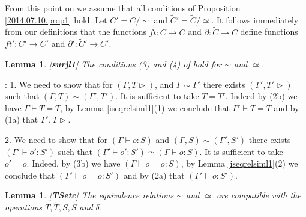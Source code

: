 \documentclass[11pt]{article}
\newenvironment{proof}{{\bf Proof}:}{\vskip 5mm }
\newtheorem{lemma}[proposition]{Lemma}
\newcommand{\llabel}[1]{\label{#1}[{\bf #1}]}
\newcommand{\sr}{\rightarrow}
\newcommand{\wt}{\widetilde}
\begin{document}
%
From this point on we assume that all conditions of Proposition \ref{2014.07.10.prop1}  hold. Let $C'=C/\sim$ and $\wt{C}'=\wt{C}/\simeq$. It follows immediately from our definitions that the functions $ft:C\sr C$ and $\partial:\wt{C}\sr C$ define functions $ft':C'\sr C'$ and $\partial':\wt{C}'\sr C'$.
%
\begin{lemma}
\llabel{surjl1}
The conditions (3) and (4) of \cite[Proposition 5.4]{Csubsystems} hold for $\sim$ and $\simeq$.
\end{lemma}
%
\begin{proof}
1. We need to show that for $(\Gamma,T\rhd)$, and $\Gamma\sim\Gamma'$ there exists $(\Gamma',T'\rhd)$ such that $(\Gamma,T)\sim(\Gamma',T')$. It is sufficient to take $T=T'$. Indeed by (2b) we have $\Gamma\vdash T=T$, by Lemma \ref{iseqrelsiml1}(1) we conclude that $\Gamma'\vdash T=T$ and by (1a) that $\Gamma',T\rhd$.  

2.  We need to show that for $(\Gamma\vdash o:S)$ and $(\Gamma,S)\sim(\Gamma',S')$ there exists $(\Gamma'\vdash o':S')$ such that $(\Gamma'\vdash o':S')\simeq(\Gamma\vdash o:S)$. It is sufficient to take $o'=o$. Indeed, by (3b) we have $(\Gamma\vdash o=o:S)$, by Lemma \ref{iseqrelsiml1}(2) we conclude that $(\Gamma'\vdash o=o:S')$ and by (2a) that $(\Gamma'\vdash o:S')$. 
\end{proof}
%
\begin{lemma}
\llabel{TSetc}
The equivalence relations $\sim$ and $\simeq$ are compatible with the operations $T,\wt{T},S,\wt{S}$ and $\delta$.
\end{lemma}
%
\end{document}
